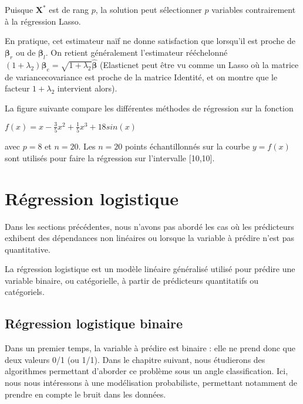 \documentclass[letterpaper,10pt,french]{sphinxmanual}
\begin{document}
\sphinxAtStartPar
Puisque \(\mathbf X^*\) est de rang \(p\), la solution peut sélectionner \(p\) variables contrairement à la régression Lasso.

\sphinxAtStartPar
En pratique, cet estimateur naïf ne donne satisfaction que lorsqu’il est proche de \(\boldsymbol\beta_r\) ou de \(\boldsymbol\beta_l\). On retient généralement l’estimateur rééchelonné \((1+\lambda_2)\boldsymbol\beta_e = \sqrt{1+\lambda_2}\hat{\boldsymbol\beta}\) (Elasticnet peut être vu comme un Lasso où la matrice de variance\sphinxhyphen{}covariance est proche de la matrice Identité, et on montre que le facteur \(1+\lambda_2\) intervient alors).

\sphinxAtStartPar
La figure suivante compare les différentes méthodes de régression sur la fonction

\sphinxAtStartPar
\(f(x) = x-\frac35 x^2+\frac15x^3 + 18sin(x)\)

\sphinxAtStartPar
avec \(p=8\) et \(n=20\). Les \(n=20\) points  échantillonnés sur la courbe \(y=f(x)\) sont utilisés pour faire la régression sur l’intervalle {[}\sphinxhyphen{}10,10{]}.

\sphinxAtStartPar
{}


\section{Régression logistique}
\label{\detokenize{regression:regression-logistique}}
\ignorespaces 
\sphinxAtStartPar
Dans les sections précédentes, nous n’avons pas abordé les cas où les prédicteurs exhibent des dépendances non linéaires ou lorsque la variable à prédire n’est pas quantitative.

\sphinxAtStartPar
La régression logistique est un modèle linéaire généralisé utilisé pour prédire une variable binaire, ou catégorielle, à partir de prédicteurs quantitatifs ou catégoriels.


\subsection{Régression logistique binaire}
\label{\detokenize{regression:regression-logistique-binaire}}
\sphinxAtStartPar
Dans un premier temps, la variable à prédire est binaire : elle ne prend donc que deux valeurs 0/1 (ou \sphinxhyphen{}1/1). Dans le chapitre suivant, nous étudierons des algorithmes permettant d’aborder ce problème sous un angle classification. Ici, nous nous intéressons à une modélisation probabiliste, permettant notamment de prendre en compte le bruit dans les données.
\end{document}
